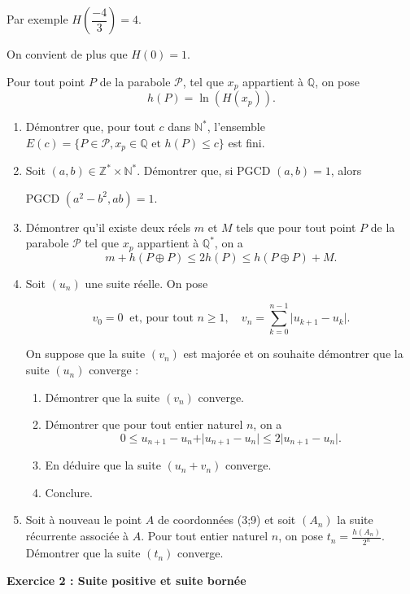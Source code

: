 \documentclass[11pt,a4paper,french]{article}
\newcommand{\N}{\mathbb{N}}
\newcommand{\Z}{\mathbb{Z}}
\newcommand{\Q}{\mathbb{Q}}
\begin{document}
Par exemple $H\left(\dfrac{-4}{3}\right)=4$.

 On convient de plus que $H(0)= 1$.

\smallskip

 Pour tout point $P$ de la parabole $\mathcal{P}$, tel que $x_p$ appartient à $\Q$, on pose 
\[h(P)= \ln(H(x_p)).\]

\begin{enumerate}[resume]
 \item Démontrer que, pour tout $c$ dans $\N^*$, l'ensemble $E(c)= \{P \in\mathcal{P}, x_p\in \Q \text{ et } h(P)\leqslant c \} $ est fini.
\item Soit $(a,b)\in \Z^* \times \N^*$. Démontrer que, si PGCD $(a, b) = 1$, alors 

PGCD $ (a^2-b^2,  ab) =1$.
\item Démontrer qu'il existe deux réels $m$ et $M$ tels que pour tout point $P$ de la parabole $\mathcal{P}$ tel que $x_p$
appartient à $\Q^*$, on a
\[m+h(P\oplus P)\leqslant 2h(P)\leqslant h(P\oplus P)+M.\]

\item Soit $(u_n)$ une suite réelle. On pose

\[v_0=0 \ \text{ et, pour tout } n\geqslant 1,\quad v_n=\sum_{k=0}^{n-1} \vert u_{k+1}-u_k\vert.\]


On suppose que la suite $(v_n)$ est majorée et on souhaite démontrer que la suite $(u_n)$ converge :
\begin{enumerate}
\item  Démontrer que la suite $(v_n)$ converge.
\item Démontrer que pour tout entier naturel $n$, on a
\[0\leqslant u_{n+1}- u_n + \vert u_{n+1} - u_n\vert\leqslant  2\vert u_{n+1} - u_n\vert .\]
\item En déduire que la suite $(u_n+ v_n)$ converge. 
\item Conclure.
\end{enumerate}
\item Soit à nouveau le point $A$ de coordonnées (3;9) et soit $(A_n)$ la suite récurrente associée à $A$. Pour
tout entier naturel $n$, on pose $ t_n=\frac{h(A_n)}{2^n}$. Démontrer que la suite $(t_n)$ converge.
\end{enumerate}

\bigskip

\begin{center}
\textbf{Exercice 2 : Suite positive et suite bornée}
\end{center}
\end{document}
